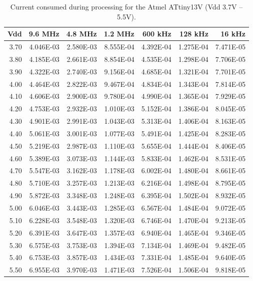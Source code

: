 \begin{table}
\begin{centering}
\begin{tabular}{|r|r|r|r|r|r|r|}
\hline
Vdd  & 9.6 MHz  & 4.8 MHz  & 1.2 MHz  & 600 kHz  & 128 kHz  & 16 kHz\tabularnewline
\hline
3.70  & 4.046E-03  & 2.580E-03  & 8.555E-04  & 4.392E-04  & 1.275E-04  & 7.471E-05 \tabularnewline
3.80  & 4.185E-03  & 2.661E-03  & 8.854E-04  & 4.535E-04  & 1.298E-04  & 7.706E-05 \tabularnewline
3.90  & 4.322E-03  & 2.740E-03  & 9.156E-04  & 4.685E-04  & 1.321E-04  & 7.701E-05 \tabularnewline
4.00  & 4.464E-03  & 2.822E-03  & 9.467E-04  & 4.834E-04  & 1.343E-04  & 7.814E-05 \tabularnewline
4.10  & 4.606E-03  & 2.900E-03  & 9.780E-04  & 4.990E-04  & 1.365E-04  & 7.929E-05 \tabularnewline
4.20  & 4.753E-03  & 2.932E-03  & 1.010E-03  & 5.152E-04  & 1.386E-04  & 8.045E-05 \tabularnewline
4.30  & 4.901E-03  & 2.991E-03  & 1.043E-03  & 5.313E-04  & 1.406E-04  & 8.163E-05 \tabularnewline
4.40  & 5.061E-03  & 3.001E-03  & 1.077E-03  & 5.491E-04  & 1.425E-04  & 8.283E-05 \tabularnewline
4.50  & 5.219E-03  & 2.987E-03  & 1.110E-03  & 5.655E-04  & 1.444E-04  & 8.406E-05 \tabularnewline
4.60  & 5.389E-03  & 3.073E-03  & 1.144E-03  & 5.833E-04  & 1.462E-04  & 8.531E-05 \tabularnewline
4.70  & 5.547E-03  & 3.162E-03  & 1.178E-03  & 6.002E-04  & 1.480E-04  & 8.661E-05 \tabularnewline
4.80  & 5.710E-03  & 3.257E-03  & 1.213E-03  & 6.216E-04  & 1.498E-04  & 8.795E-05 \tabularnewline
4.90  & 5.872E-03  & 3.348E-03  & 1.248E-03  & 6.395E-04  & 1.502E-04  & 8.932E-05 \tabularnewline
5.00  & 6.046E-03  & 3.443E-03  & 1.285E-03  & 6.567E-04  & 1.484E-04  & 9.072E-05 \tabularnewline
5.10  & 6.228E-03  & 3.548E-03  & 1.320E-03  & 6.746E-04  & 1.470E-04  & 9.213E-05 \tabularnewline
5.20  & 6.391E-03  & 3.647E-03  & 1.357E-03  & 6.940E-04  & 1.465E-04  & 9.346E-05 \tabularnewline
5.30  & 6.575E-03  & 3.753E-03  & 1.394E-03  & 7.134E-04  & 1.469E-04  & 9.482E-05 \tabularnewline
5.40  & 6.753E-03  & 3.857E-03  & 1.434E-03  & 7.331E-04  & 1.485E-04  & 9.640E-05 \tabularnewline
5.50  & 6.955E-03  & 3.970E-03  & 1.471E-03  & 7.526E-04  & 1.506E-04  & 9.818E-05 \tabularnewline
\hline
\end{tabular}
\par\end{centering}

\protect\caption{Current consumed during processing for the Atmel ATtiny13V (Vdd 3.7V -- 5.5V).}


\end{table}
